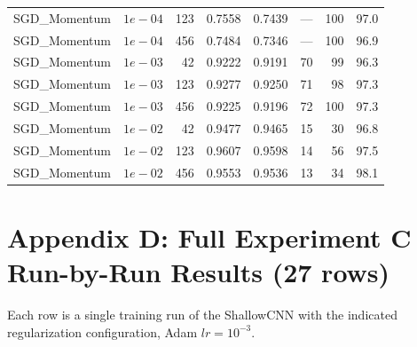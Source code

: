 \documentclass[10pt,letterpaper]{article}
\begin{document}
\begin{longtable}{lrrrrrrr}
SGD\_Momentum & $1e-04$ & 123 & 0.7558 & 0.7439 & --- & 100 & 97.0 \\
SGD\_Momentum & $1e-04$ & 456 & 0.7484 & 0.7346 & --- & 100 & 96.9 \\
SGD\_Momentum & $1e-03$ & 42 & 0.9222 & 0.9191 & 70 & 99 & 96.3 \\
SGD\_Momentum & $1e-03$ & 123 & 0.9277 & 0.9250 & 71 & 98 & 97.3 \\
SGD\_Momentum & $1e-03$ & 456 & 0.9225 & 0.9196 & 72 & 100 & 97.3 \\
SGD\_Momentum & $1e-02$ & 42 & 0.9477 & 0.9465 & 15 & 30 & 96.8 \\
SGD\_Momentum & $1e-02$ & 123 & 0.9607 & 0.9598 & 14 & 56 & 97.5 \\
SGD\_Momentum & $1e-02$ & 456 & 0.9553 & 0.9536 & 13 & 34 & 98.1 \\
\bottomrule
\end{longtable}

\section{Appendix D: Full Experiment C Run-by-Run Results (27 rows)}
Each row is a single training run of the ShallowCNN with the indicated regularization configuration, Adam $lr{=}10^{-3}$.
\end{document}
